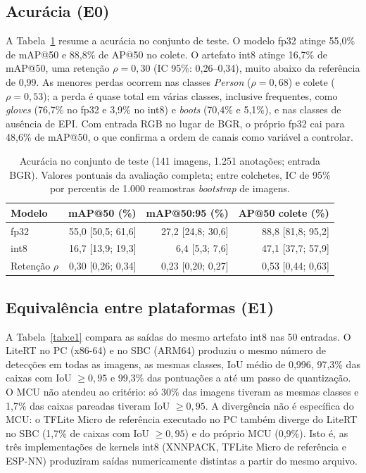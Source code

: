 \documentclass[11pt,a4paper]{article}
\begin{document}
\subsection{Acurácia (E0)}
A Tabela~\ref{tab:e0} resume a acurácia no conjunto de teste. O modelo fp32 atinge 55,0\% de mAP@50 e 88,8\% de
AP@50 no colete. O artefato int8 atinge 16,7\% de mAP@50, uma retenção $\rho=0{,}30$ (IC 95\%: 0,26--0,34),
muito abaixo da referência de 0,99. As menores perdas ocorrem nas classes \emph{Person} ($\rho=0{,}68$) e colete
($\rho=0{,}53$); a perda é quase total em várias classes, inclusive frequentes, como \emph{gloves} (76,7\% no fp32
e 3,9\% no int8) e \emph{boots} (70,4\% e 5,1\%), e nas classes de ausência de EPI. Com entrada RGB no lugar de
BGR, o próprio fp32 cai para 48,6\% de mAP@50, o que confirma a ordem de canais como variável a controlar.

\begin{table}[H]\centering\small
\caption{Acurácia no conjunto de teste (141 imagens, 1.251 anotações; entrada BGR). Valores pontuais da avaliação
completa; entre colchetes, IC de 95\% por percentis de 1.000 reamostras \emph{bootstrap} de imagens.}\label{tab:e0}
\begin{tabular}{lrrr}\toprule
Modelo & mAP@50 (\%) & mAP@50:95 (\%) & AP@50 colete (\%)\\\midrule
fp32 & 55,0 [50,5; 61,6] & 27,2 [24,8; 30,6] & 88,8 [81,8; 95,2]\\
int8 & 16,7 [13,9; 19,3] & 6,4 [5,3; 7,6] & 47,1 [37,7; 57,9]\\\midrule
Retenção $\rho$ & 0,30 [0,26; 0,34] & 0,23 [0,20; 0,27] & 0,53 [0,44; 0,63]\\\bottomrule
\end{tabular}
\end{table}

\subsection{Equivalência entre plataformas (E1)}
A Tabela~\ref{tab:e1} compara as saídas do mesmo artefato int8 nas 50 entradas. O LiteRT no PC (x86-64) e no SBC
(ARM64) produziu o mesmo número de detecções em todas as imagens, as mesmas classes, IoU médio de 0,996, 97,3\% das
caixas com IoU $\geq0{,}95$ e 99,3\% das pontuações a até um passo de quantização. O MCU não atendeu ao critério:
só 30\% das imagens tiveram as mesmas classes e 1,7\% das caixas pareadas tiveram IoU $\geq0{,}95$. A divergência
não é específica do MCU: o TFLite Micro de referência executado no PC também diverge do LiteRT no SBC (1,7\% de caixas com
IoU $\geq0{,}95$) e do próprio MCU (0,9\%). Isto é, as três implementações de kernels int8 (XNNPACK, TFLite Micro de
referência e ESP-NN) produziram saídas numericamente distintas a partir do mesmo arquivo.
\end{document}
